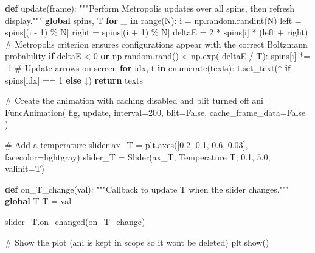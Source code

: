 \documentclass[
  letterpaper,
  DIV=11,
  numbers=noendperiod]{scrreprt}
\newenvironment{Shaded}{\begin{snugshade}}{\end{snugshade}}
\newcommand{\BuiltInTok}[1]{\textcolor[rgb]{0.00,0.23,0.31}{#1}}
\newcommand{\CommentTok}[1]{\textcolor[rgb]{0.37,0.37,0.37}{#1}}
\newcommand{\ControlFlowTok}[1]{\textcolor[rgb]{0.00,0.23,0.31}{\textbf{#1}}}
\newcommand{\DecValTok}[1]{\textcolor[rgb]{0.68,0.00,0.00}{#1}}
\newcommand{\FloatTok}[1]{\textcolor[rgb]{0.68,0.00,0.00}{#1}}
\newcommand{\KeywordTok}[1]{\textcolor[rgb]{0.00,0.23,0.31}{\textbf{#1}}}
\newcommand{\NormalTok}[1]{\textcolor[rgb]{0.00,0.23,0.31}{#1}}
\newcommand{\OperatorTok}[1]{\textcolor[rgb]{0.37,0.37,0.37}{#1}}
\newcommand{\StringTok}[1]{\textcolor[rgb]{0.13,0.47,0.30}{#1}}
\newcommand{\VariableTok}[1]{\textcolor[rgb]{0.07,0.07,0.07}{#1}}
\begin{document}
\begin{Shaded}
\begin{Highlighting}[]
\KeywordTok{def}\NormalTok{ update(frame):}
    \CommentTok{"""Perform Metropolis updates over all spins, then refresh display."""}
    \KeywordTok{global}\NormalTok{ spins, T}
    \ControlFlowTok{for}\NormalTok{ \_ }\KeywordTok{in} \BuiltInTok{range}\NormalTok{(N):}
\NormalTok{        i }\OperatorTok{=}\NormalTok{ np.random.randint(N)}
\NormalTok{        left }\OperatorTok{=}\NormalTok{ spins[(i }\OperatorTok{{-}} \DecValTok{1}\NormalTok{) }\OperatorTok{\%}\NormalTok{ N]}
\NormalTok{        right }\OperatorTok{=}\NormalTok{ spins[(i }\OperatorTok{+} \DecValTok{1}\NormalTok{) }\OperatorTok{\%}\NormalTok{ N]}
\NormalTok{        deltaE }\OperatorTok{=} \DecValTok{2} \OperatorTok{*}\NormalTok{ spins[i] }\OperatorTok{*}\NormalTok{ (left }\OperatorTok{+}\NormalTok{ right)}
        \CommentTok{\# Metropolis criterion ensures configurations appear with the correct Boltzmann probability}
        \ControlFlowTok{if}\NormalTok{ deltaE }\OperatorTok{\textless{}} \DecValTok{0} \KeywordTok{or}\NormalTok{ np.random.rand() }\OperatorTok{\textless{}}\NormalTok{ np.exp(}\OperatorTok{{-}}\NormalTok{deltaE }\OperatorTok{/}\NormalTok{ T):}
\NormalTok{            spins[i] }\OperatorTok{*=} \OperatorTok{{-}}\DecValTok{1}
    \CommentTok{\# Update arrows on screen}
    \ControlFlowTok{for}\NormalTok{ idx, t }\KeywordTok{in} \BuiltInTok{enumerate}\NormalTok{(texts):}
\NormalTok{        t.set\_text(}\StringTok{\textquotesingle{}↑\textquotesingle{}} \ControlFlowTok{if}\NormalTok{ spins[idx] }\OperatorTok{==} \DecValTok{1} \ControlFlowTok{else} \StringTok{\textquotesingle{}↓\textquotesingle{}}\NormalTok{)}
    \ControlFlowTok{return}\NormalTok{ texts}

\CommentTok{\# Create the animation with caching disabled and blit turned off}
\NormalTok{ani }\OperatorTok{=}\NormalTok{ FuncAnimation(}
\NormalTok{    fig,}
\NormalTok{    update,}
\NormalTok{    interval}\OperatorTok{=}\DecValTok{200}\NormalTok{,}
\NormalTok{    blit}\OperatorTok{=}\VariableTok{False}\NormalTok{,}
\NormalTok{    cache\_frame\_data}\OperatorTok{=}\VariableTok{False}
\NormalTok{)}

\CommentTok{\# Add a temperature slider}
\NormalTok{ax\_T }\OperatorTok{=}\NormalTok{ plt.axes([}\FloatTok{0.2}\NormalTok{, }\FloatTok{0.1}\NormalTok{, }\FloatTok{0.6}\NormalTok{, }\FloatTok{0.03}\NormalTok{], facecolor}\OperatorTok{=}\StringTok{\textquotesingle{}lightgray\textquotesingle{}}\NormalTok{)}
\NormalTok{slider\_T }\OperatorTok{=}\NormalTok{ Slider(ax\_T, }\StringTok{\textquotesingle{}Temperature T\textquotesingle{}}\NormalTok{, }\FloatTok{0.1}\NormalTok{, }\FloatTok{5.0}\NormalTok{, valinit}\OperatorTok{=}\NormalTok{T)}

\KeywordTok{def}\NormalTok{ on\_T\_change(val):}
    \CommentTok{"""Callback to update T when the slider changes."""}
    \KeywordTok{global}\NormalTok{ T}
\NormalTok{    T }\OperatorTok{=}\NormalTok{ val}

\NormalTok{slider\_T.on\_changed(on\_T\_change)}

\CommentTok{\# Show the plot (ani is kept in scope so it won\textquotesingle{}t be deleted)}
\NormalTok{plt.show()}
\end{Highlighting}
\end{Shaded}
\end{document}
